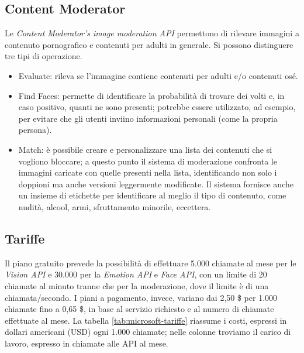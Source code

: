 \subsection{Content Moderator}
Le \textit{Content Moderator’s image moderation API} \cite{microsoft-api-2} permettono di rilevare immagini a contenuto pornografico e contenuti per adulti in generale.
Si possono distinguere tre tipi di operazione.
\begin{itemize}
\item \textsf{Evaluate}: rileva se l'immagine contiene contenuti per adulti e/o contenuti osé.
\item \textsf{Find Faces}: permette di identificare la probabilità di trovare dei volti e, in caso positivo, quanti ne sono presenti; potrebbe essere utilizzato, ad esempio, per evitare che gli utenti inviino informazioni personali (come la propria persona).
\item \textsf{Match}: è possibile creare e personalizzare una lista dei contenuti che si vogliono bloccare; a questo punto il sistema di moderazione confronta le immagini caricate
con quelle presenti nella lista, identificando non solo i doppioni ma anche versioni leggermente modificate.
Il sistema fornisce anche un insieme di etichette per identificare al meglio il tipo di contenuto, come nudità, alcool, armi, sfruttamento minorile, eccettera.  
\end{itemize}
%
%
\subsection{Tariffe}
Il piano gratuito prevede la possibilità di effettuare 5.000 chiamate al mese per le \textit{Vision API} e 30.000 per la \textit{Emotion API} e \textit{Face API}, con un limite di 20 chiamate al minuto tranne che per la moderazione, dove il limite è di una chiamata/secondo.
I piani a pagamento, invece, variano dai 2,50 \$ per 1.000 chiamate fino a 0,65 \$, in base al servizio richiesto e al numero di chiamate effettuate al mese.
La tabella \ref{tab:microsoft-tariffe} riassume i costi, espressi in dollari americani (USD) ogni 1.000 chiamate; nelle colonne troviamo il carico di lavoro, espresso in chiamate alle API al mese.


